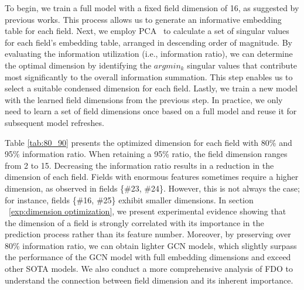 \documentclass[sigconf]{acmart}
\begin{document}
To begin, we train a full model with a fixed field dimension of 16, as suggested by previous works\cite{sun2021fm2, zhu2022bars, zhu2020fuxictr}. This process allows us to generate an informative embedding table for each field. Next, we employ PCA~\cite{abdi2010principal} to calculate a set of singular values for each field's embedding table, arranged in descending order of magnitude. By evaluating the information utilization (i.e., information ratio), we can determine the optimal dimension by identifying the $argmin_k$ singular values that contribute most significantly to the overall information summation. This step enables us to select a suitable condensed dimension for each field. Lastly, we train a new model with the learned field dimensions from the previous step. In practice, we only need to learn a set of field dimensions once based on a full model and reuse it for subsequent model refreshes.

Table \ref{tab:80_90} presents the optimized dimension for each field with 80\% and 95\% information ratio. When retaining a 95\% ratio, the field dimension ranges from 2 to 15. Decreasing the information ratio results in a reduction in the dimension of each field. Fields with enormous features sometimes require a higher dimension, as observed in fields \{\#23, \#24\}. However, this is not always the case; for instance, fields \{\#16, \#25\} exhibit smaller dimensions. In section ~\ref{exp:dimension optimization}, we present experimental evidence showing that the dimension of a field is strongly correlated with its importance in the prediction process rather than its feature number. Moreover, by preserving over 80\% information ratio, we can obtain lighter GCN models, which slightly surpass the performance of the GCN model with full embedding dimensions and exceed other SOTA models. We also conduct a more comprehensive analysis of FDO to understand the connection between field dimension and its inherent importance.
\end{document}
